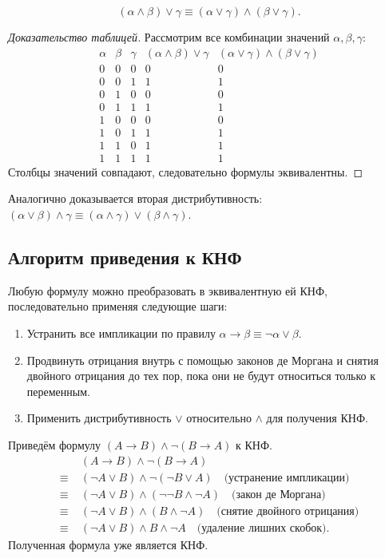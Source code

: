 \documentclass[10pt]{article}
\begin{document}
\begin{lemma}
\[
(\alpha\land\beta)\lor\gamma \equiv (\alpha\lor\gamma)\land(\beta\lor\gamma).
\]
\end{lemma}
\begin{proof}[Доказательство таблицей]
Рассмотрим все комбинации значений \(\alpha,\beta,\gamma\):
\[
\begin{array}{ccc|c|c}
\alpha & \beta & \gamma & (\alpha\land\beta)\lor\gamma & (\alpha\lor\gamma)\land(\beta\lor\gamma) \\
\hline
0 & 0 & 0 & 0 & 0 \\
0 & 0 & 1 & 1 & 1 \\
0 & 1 & 0 & 0 & 0 \\
0 & 1 & 1 & 1 & 1 \\
1 & 0 & 0 & 0 & 0 \\
1 & 0 & 1 & 1 & 1 \\
1 & 1 & 0 & 1 & 1 \\
1 & 1 & 1 & 1 & 1
\end{array}
\]
Столбцы значений совпадают, следовательно формулы эквивалентны.
\end{proof}

Аналогично доказывается вторая дистрибутивность: \((\alpha\lor\beta)\land\gamma \equiv (\alpha\land\gamma)\lor(\beta\land\gamma)\).

\subsection{Алгоритм приведения к КНФ}
Любую формулу можно преобразовать в эквивалентную ей КНФ, последовательно применяя следующие шаги:
\begin{enumerate}
\item Устранить все импликации по правилу \(\alpha\to\beta \equiv \neg\alpha\lor\beta\).
\item Продвинуть отрицания внутрь с помощью законов де Моргана и снятия двойного отрицания до тех пор, пока они не будут относиться только к переменным.
\item Применить дистрибутивность \(\lor\) относительно \(\land\) для получения КНФ.
\end{enumerate}

\begin{example}
Приведём формулу \((A \to B) \land \neg(B \to A)\) к КНФ.
\begin{align*}
&(A \to B) \land \neg(B \to A) \\
\equiv\;& (\neg A \lor B) \land \neg(\neg B \lor A) \quad \text{(устранение импликации)}\\
\equiv\;& (\neg A \lor B) \land (\neg\neg B \land \neg A) \quad \text{(закон де Моргана)}\\
\equiv\;& (\neg A \lor B) \land (B \land \neg A) \quad \text{(снятие двойного отрицания)}\\
\equiv\;& (\neg A \lor B) \land B \land \neg A \quad \text{(удаление лишних скобок)}.
\end{align*}
Полученная формула уже является КНФ.
\end{example}
\end{document}
